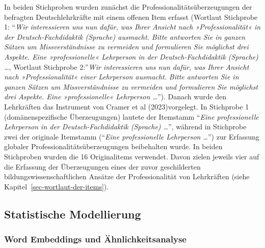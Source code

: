 \documentclass[
  letterpaper,
  DIV=11]{scrartcl}
\begin{document}
In beiden Stichproben wurden zunächst die Professionalitätsüberzeugungen
der befragten Deutschlehrkräfte mit einem offenen Item erfasst (Wortlaut
Stichprobe 1: ``\emph{Wir interessieren uns nun dafür, was Ihrer Ansicht
nach »Professionalität« in der Deutsch-Fachdidaktik (Sprache) ausmacht.
Bitte antworten Sie in ganzen Sätzen um Missverständnisse zu vermeiden
und formulieren Sie möglichst drei Aspekte. Eine »professionelle«
Lehrperson in der Deutsch-Fachdidaktik (Sprache) \ldots{}}, Wortlaut
Stichprobe 2:''\emph{Wir interessieren uns nun dafür, was Ihrer Ansicht
nach »Professionalität« einer Lehrperson ausmacht. Bitte antworten Sie
in ganzen Sätzen um Missverständnisse zu vermeiden und formulieren Sie
möglichst drei Aspekte. Eine »professionelle« Lehrperson \ldots{}}'').
Danach wurde den Lehrkräften das Instrument von Cramer et al
(2023)vorgelegt. In Stichprobe 1 (domänenspezifische Überzeugungen)
lautete der Itemstamm ``\emph{Eine professionelle Lehrperson in der
Deutsch-Fachdidaktik (Sprache) \ldots{}}'', während in Stichprobe zwei
der originale Itemstamm (``\emph{Eine professionelle Lehrperson
\ldots{}}'') zur Erfassung globaler Professionalitätsüberzeugungen
beibehalten wurde. In beiden Stichproben wurden die 16 Originalitems
verwendet. Davon zielen jeweils vier auf die Erfassung der Überzeugungen
eines der zuvor geschilderten bildungswissenschaftlichen Ansätze der
Professionalität von Lehrkräften (siehe
Kapitel~\ref{sec-wortlaut-der-items}).

\subsection{Statistische Modellierung}\label{statistische-modellierung}

\subsubsection{Word Embeddings und
Ähnlichkeitsanalyse}\label{sec-word-embeddings}
\end{document}
